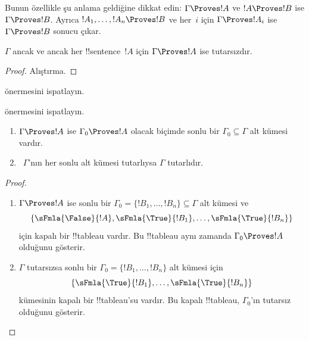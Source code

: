 Bunun özellikle şu anlama geldiğine dikkat edin: $\Gamma \Proves !A$ ve
$!A \Proves !B$ ise $\Gamma \Proves !B$. Ayrıca $!A_1,
\dots, !A_n \Proves !B$ ve her~$i$ için $\Gamma \Proves !A_i$ ise
$\Gamma \Proves !B$ sonucu çıkar.

\begin{prop}
$\Gamma$ ancak ve ancak her !!{sentence}~$!A$ için $\Gamma \Proves !A$
ise tutarsızdır.
\end{prop}

\begin{proof}
Alıştırma.
\end{proof}

\begin{prob}
 önermesini ispatlayın.
\end{prob}
\tagendprob

\begin{prob}
 önermesini ispatlayın.
\end{prob}
\tagendprob

\begin{prop}[Kompaktlık]
  \begin{enumerate}
  \item $\Gamma \Proves !A$ ise $\Gamma_0 \Proves !A$ olacak biçimde sonlu
    bir $\Gamma_0 \subseteq \Gamma$ alt kümesi vardır.
  \item ~$\Gamma$'nın her sonlu alt kümesi tutarlıysa $\Gamma$ tutarlıdır.
  \end{enumerate}
\end{prop}

\begin{proof}
  \begin{enumerate}
    \item $\Gamma \Proves !A$ ise sonlu bir
      $\Gamma_0 = \{!B_1, \dots, !B_n\} \subseteq \Gamma$ alt kümesi ve
      \[
      \{\sFmla{\False}{!A}, \sFmla{\True}{!B_1}, \dots, \sFmla{\True}{!B_n}\}
      \]
      için kapalı bir !!{tableau} vardır. Bu !!{tableau} aynı zamanda
      $\Gamma_0 \Proves !A$ olduğunu gösterir.
    \item $\Gamma$ tutarsızsa sonlu bir
      $\Gamma_0 = \{!B_1, \dots, !B_n\}$ alt kümesi için
      \[
      \{\sFmla{\True}{!B_1}, \dots, \sFmla{\True}{!B_n}\}
      \]
      kümesinin kapalı bir !!{tableau}'su vardır. Bu kapalı !!{tableau},
      $\Gamma_0$'ın tutarsız olduğunu gösterir.
  \end{enumerate}
\end{proof}

